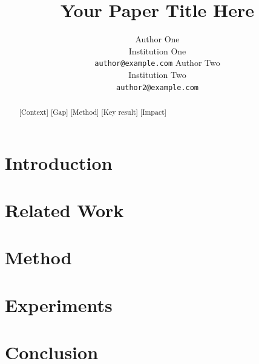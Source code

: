 \documentclass{article}
\title{Your Paper Title Here}
\author{Author One \\ Institution One \\ \texttt{author@example.com} \And
  Author Two \\ Institution Two \\ \texttt{author2@example.com}}
\begin{document}
\maketitle

\begin{abstract}
  [Context] [Gap] [Method] [Key result] [Impact]
\end{abstract}

\section{Introduction}
\section{Related Work}
\section{Method}
\section{Experiments}
\section{Conclusion}



\end{document}
